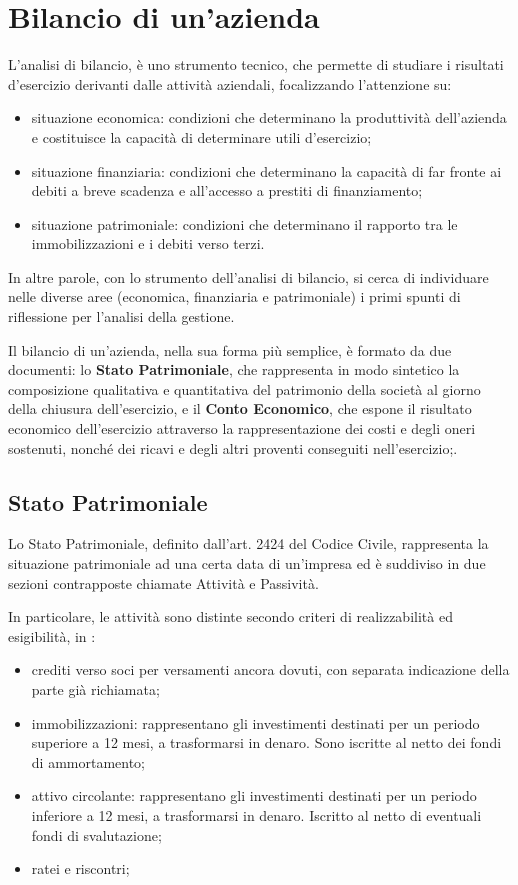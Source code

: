 
\chapter{Bilancio di un'azienda}

L’analisi di bilancio, è uno strumento tecnico, che permette di studiare i risultati d’esercizio derivanti dalle attività aziendali, focalizzando l’attenzione su:
\begin{itemize}
 \item situazione economica: condizioni che determinano la produttività dell’azienda e costituisce la capacità di determinare utili d’esercizio;
 \item situazione finanziaria: condizioni che determinano la capacità di far fronte ai debiti a breve scadenza e all’accesso a prestiti di finanziamento;
 \item situazione patrimoniale: condizioni che determinano il rapporto tra le immobilizzazioni e i debiti verso terzi.
\end{itemize}
In altre parole, con lo strumento dell’analisi di bilancio, si cerca di individuare nelle diverse aree (economica, finanziaria e patrimoniale) i primi spunti di riflessione per l’analisi della gestione.

Il bilancio di un'azienda, nella sua forma più semplice, è formato da due documenti: lo \textbf{Stato Patrimoniale}, che rappresenta in modo sintetico la composizione qualitativa e quantitativa del patrimonio della società al giorno della chiusura dell’esercizio, e il \textbf{Conto Economico}, che espone il risultato economico dell’esercizio attraverso la rappresentazione dei costi e degli oneri sostenuti, nonché dei ricavi e degli altri proventi conseguiti nell’esercizio;.



\section{Stato Patrimoniale}

Lo Stato Patrimoniale, definito dall'art. 2424 del Codice Civile, rappresenta la situazione patrimoniale ad una certa data di un'impresa ed è suddiviso in due sezioni contrapposte chiamate Attività e Passività.

In particolare, le attività sono distinte secondo criteri di realizzabilità ed esigibilità, in :
\begin{itemize}
 \item crediti verso soci per versamenti ancora dovuti, con separata indicazione della parte già richiamata;
 \item immobilizzazioni: rappresentano gli investimenti destinati per un periodo superiore a 12 mesi, a trasformarsi in denaro. Sono iscritte al netto dei fondi di ammortamento;
 \item attivo circolante: rappresentano gli investimenti destinati per un periodo inferiore a 12 mesi, a trasformarsi in denaro. Iscritto al netto di eventuali fondi di svalutazione;
 \item ratei e riscontri;
\end{itemize}

